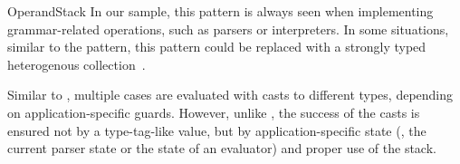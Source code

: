\begin{pattern}{OperandStack}
\issues{}
In our sample,
this pattern is always seen when implementing grammar-related operations,
such as parsers or interpreters.
In some situations, similar to the  pattern,
this pattern could be replaced with a strongly typed heterogenous collection~\citep{kiselyovStronglyTypedHeterogeneous2004}.

Similar to ,
multiple cases are evaluated with casts to different types,
depending on application-specific guards.
However, unlike , 
the success of the casts is ensured not by a type-tag-like value,
but by application-specific state
(\eg{}, the current parser state or the state of an evaluator)
and proper use of the stack.

\end{pattern}
